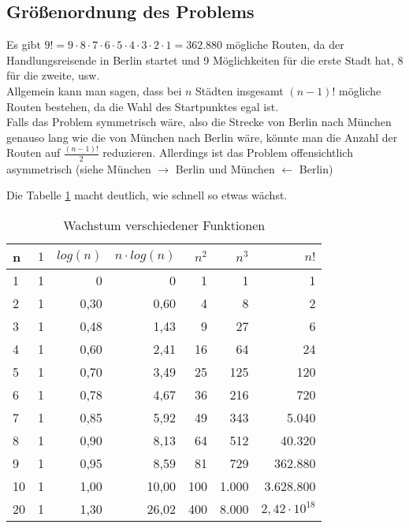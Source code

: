 \documentclass[a4paper,9pt]{scrartcl}
\begin{document}
  \subsection{Größenordnung des Problems}
    Es gibt $9! = 9 \cdot 8 \cdot 7 \cdot 6 \cdot 5 \cdot 4 \cdot 3 \cdot 2 \cdot 1 = 362.880$ mögliche Routen,
    da der Handlungsreisende in Berlin startet und 9 Möglichkeiten für die erste 
    Stadt hat, 8 für die zweite, usw.\\
    Allgemein kann man sagen, dass bei $n$ Städten insgesamt $(n-1)!$ mögliche 
    Routen bestehen, da die Wahl des Startpunktes egal ist. \\
    Falls das  Problem symmetrisch wäre, also die Strecke von Berlin nach 
    München genauso lang wie die von München nach Berlin wäre, könnte man die
    Anzahl der Routen auf $\frac{(n-1)!}{2}$ reduzieren. Allerdings ist das 
    Problem offensichtlich asymmetrisch (siehe München $\rightarrow$ Berlin und 
    München $\leftarrow$ Berlin)

    Die Tabelle \ref{tab:functionGrowth} macht deutlich, wie schnell so etwas 
    wächst.
    \begin{table}[hc]
        \centering
        \begin{tabular}[hc]{|l|r|r|r|r|r|r|}
          \hline
          n         & $1$   & $log(n)$  & $n \cdot log(n)$  & $n^2$ & $n^3$ & $n!$  \\
          \hline\hline
          1         & 1     & 0         & 0                 & 1     &   1   & 1     \\
          2         & 1     & 0,30      & 0,60              & 4     &   8   & 2     \\
          3         & 1     & 0,48      & 1,43              & 9     &   27  & 6     \\
          4         & 1     & 0,60      & 2,41              & 16    &   64  & 24    \\
          5         & 1     & 0,70      & 3,49              & 25    &   125 & 120   \\
          6         & 1     & 0,78      & 4,67              & 36    &   216 & 720   \\
          7         & 1     & 0,85      & 5,92              & 49    &   343 & 5.040 \\
          8         & 1     & 0,90      & 8,13              & 64    &   512 & 40.320\\
          9         & 1     & 0,95      & 8,59              & 81    &   729 & 362.880\\
         10         & 1     & 1,00      & 10,00             & 100   & 1.000 & 3.628.800\\
         20         & 1     & 1,30      & 26,02             & 400   & 8.000 & $2,42 \cdot 10^{18}$ \\
          \hline
        \end{tabular}
        \caption{Wachstum verschiedener Funktionen}
        \label{tab:functionGrowth}
    \end{table}
  \newpage
\end{document}
